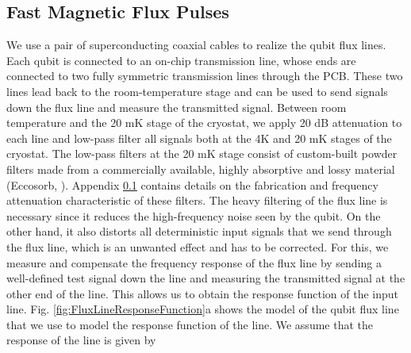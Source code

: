 \subsection{Fast Magnetic Flux Pulses}

We use a pair of superconducting coaxial cables to realize the qubit flux lines. Each qubit is connected to an on-chip transmission line, whose ends are connected to two fully symmetric transmission lines through the PCB. These two lines lead back to the room-temperature stage and can be used to send signals down the flux line and measure the transmitted signal. Between room temperature and the 20 mK stage of the cryostat, we apply 20 dB attenuation to each line and low-pass filter all signals both at the 4K and 20 mK stages of the cryostat. The low-pass filters at the 20 mK stage consist of custom-built powder filters made from a commercially available, highly absorptive and lossy material (Eccosorb, \citep{}). Appendix \ref{} contains details on the fabrication and frequency attenuation characteristic of these filters. The heavy filtering of the flux line is necessary since it reduces the high-frequency noise seen by the qubit. On the other hand, it also distorts all deterministic input signals that we send through the flux line, which is an unwanted effect and has to be corrected. For this, we measure and compensate the frequency response of the flux line by sending a well-defined test signal down the line and measuring the transmitted signal at the other end of the line. This allows us to obtain the response function of the input line. Fig. \ref{fig:FluxLineResponseFunction}a shows the model of the qubit flux line that we use to model the response function of the line. We assume that the response of the line is given by

